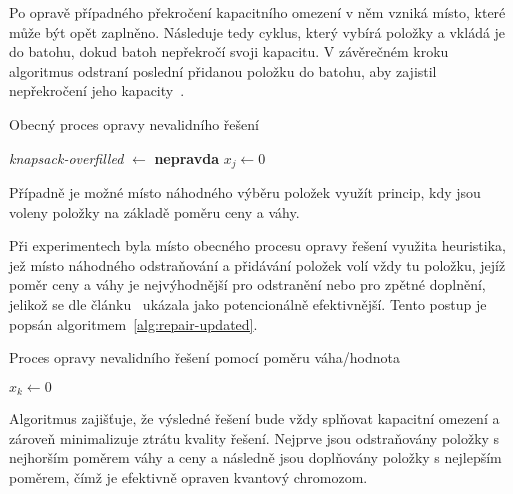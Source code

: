 Po opravě případného překročení kapacitního omezení v něm vzniká místo, které může být opět zaplněno. 
Následuje tedy cyklus, který vybírá položky a vkládá je do batohu, dokud batoh nepřekročí svoji kapacitu. 
V závěrečném kroku algoritmus odstraní poslední přidanou položku do batohu, aby zajistil nepřekročení jeho kapacity~\cite{qiga}.
\begin{algorithm}[ht!]
    \caption{Obecný proces opravy nevalidního řešení~\cite{qiga}}
    \label{alg:repair}
    \textit{knapsack-overfilled} $\gets$ \textbf{nepravda}\;
    $x_j \gets 0$\;
\end{algorithm}

Případně je možné místo náhodného výběru položek využít princip, kdy jsou voleny položky na základě poměru ceny a váhy. 

Při experimentech byla místo obecného procesu opravy řešení využita heuristika, jež místo náhodného odstraňování a přidávání položek volí vždy tu položku, jejíž poměr ceny a váhy je nejvýhodnější pro odstranění nebo pro zpětné doplnění, jelikož se dle článku~\cite{repair1} ukázala jako potencionálně efektivnější. 
Tento postup je popsán algoritmem~\ref{alg:repair-updated}.

\begin{algorithm}[H]
    \caption{Proces opravy nevalidního řešení pomocí poměru váha/hodnota~\cite{repair1,repair2,repair3}}
    \label{alg:repair-updated}
    $x_k \gets 0$\;
    \;
\end{algorithm}
Algoritmus zajišťuje, že výsledné řešení bude vždy splňovat kapacitní omezení a zároveň minimalizuje ztrátu kvality řešení. 
Nejprve jsou odstraňovány položky s nejhorším poměrem váhy a ceny a následně jsou doplňovány položky s nejlepším poměrem, čímž je efektivně opraven kvantový chromozom. 

